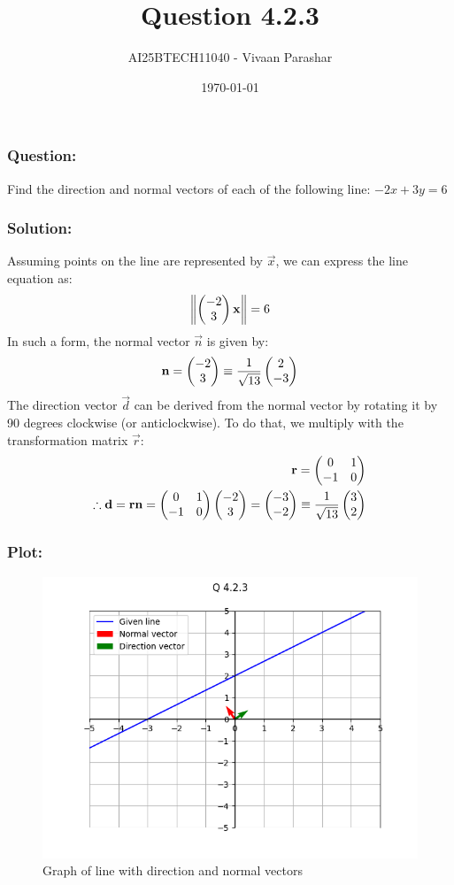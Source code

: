 \documentclass{beamer}
\title{Question 4.2.3}
\author{AI25BTECH11040 - Vivaan Parashar}
\date{\today}
\begin{document}
\frame{\titlepage}

\begin{frame}
    \frametitle{Question: }
    Find the direction and normal vectors of each of the following line: $-2x + 3y = 6$
\end{frame}

\begin{frame}
    \frametitle{Solution: }
    Assuming points on the line are represented by $\vec{x}$, we can express the line equation as:
    \begin{align}
        \left\lVert\begin{pmatrix}-2 \\ 3\end{pmatrix}\mathbf{x}\right\rVert = 6
    \end{align}
    In such a form, the normal vector $\vec{n}$ is given by:
    \begin{align}
        \mathbf{n} = \begin{pmatrix}-2 \\ 3\end{pmatrix} \equiv \frac{1}{\sqrt{13}}\begin{pmatrix}2 \\ -3\end{pmatrix}
    \end{align}
    The direction vector $\vec{d}$ can be derived from the normal vector by rotating it by 90 degrees clockwise (or anticlockwise). To do that, we multiply with the transformation matrix $\vec{r}$:
    \begin{align}
        \mathbf{r} = \begin{pmatrix}0                             & 1 \\ -1 & 0\end{pmatrix}\\
        \therefore \mathbf{d} = \mathbf{r}\mathbf{n} = \begin{pmatrix}0 & 1 \\ -1 & 0\end{pmatrix}\begin{pmatrix}-2 \\ 3\end{pmatrix} = \begin{pmatrix}-3 \\ -2\end{pmatrix} \equiv \frac{1}{\sqrt{13}}\begin{pmatrix}3 \\ 2\end{pmatrix}
    \end{align}
\end{frame}

\begin{frame}
    \frametitle{Plot: }
    \begin{figure}[h!]
        \centering
        \includegraphics[width=0.9\columnwidth]{../figs/plot.png}
        \caption{Graph of line with direction and normal vectors}
        \label{fig:4.2.3}
    \end{figure}
\end{frame}
\end{document}
